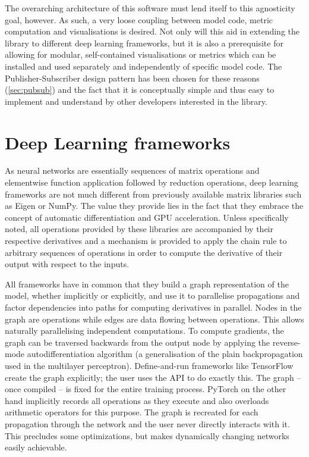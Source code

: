 The overarching architecture of this software must lend itself to this
agnosticity goal, however. As such, a very loose coupling between model code,
metric computation and visualisations is desired. Not only will this aid in
extending the library to different deep learning frameworks, but it is also a
prerequisite for allowing for modular, self-contained visualisations or metrics
which can be installed and used separately and independently of specific model
code. The Publisher-Subscriber design pattern has been chosen for these reasons
(\cref{sec:pubsub}) and the fact that it is conceptually simple and thus easy to
implement and understand by other developers interested in the library.

\hypertarget{sec:dl-frameworks}{%
\section{Deep Learning frameworks}\label{sec:dl-frameworks}}

As neural networks are essentially sequences of matrix operations and
elementwise function application followed by reduction operations, deep learning
frameworks are not much different from previously available matrix libraries
such as Eigen or NumPy. The value they provide lies in the fact that they
embrace the concept of automatic differentiation and GPU acceleration. Unless
specifically noted, all operations provided by these libraries are accompanied
by their respective derivatives and a mechanism is provided to apply the chain
rule to arbitrary sequences of operations in order to compute the derivative of
their output with respect to the inputs.

All frameworks have in common that they build a graph representation of the
model, whether implicitly or explicitly, and use it to parallelise propagations
and factor dependencies into paths for computing derivatives in parallel. Nodes
in the graph are operations while edges are data flowing between operations.
This allows naturally parallelising independent computations. To compute
gradients, the graph can be traversed backwards from the output node by applying
the reverse-mode autodifferentiation algorithm (a generalisation of the plain
backpropagation used in the multilayer perceptron).  Define-and-run frameworks
like TensorFlow create the graph explicitly; the user uses the API to do exactly
this. The graph -- once compiled -- is fixed for the entire training process.
PyTorch on the other hand implicitly records all operations as they execute and
also overloads arithmetic operators for this purpose. The graph is recreated for each
propagation through the network and the user never directly interacts with it.
This precludes some optimizations, but makes dynamically changing networks
easily achievable.


